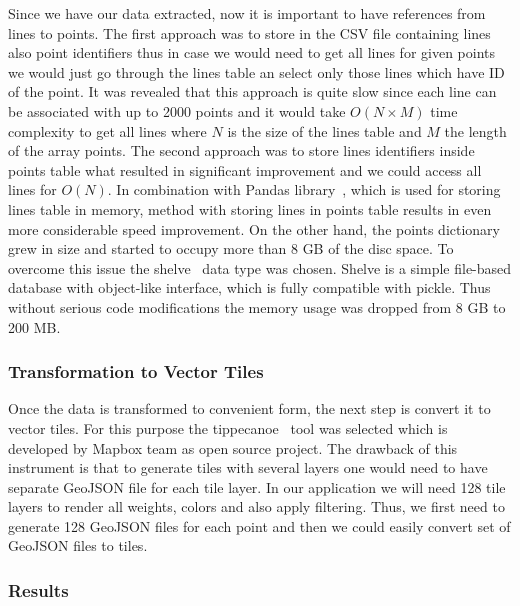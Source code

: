 Since we have our data extracted, now it is important to have references from lines to points. The
first approach was to store in the CSV file containing lines also point identifiers thus in case we
would need to get all lines for given points we would just go through the lines table an select only
those lines which have ID of the point. It was revealed that this approach is quite slow since each
line can be associated with up to 2000 points and it would take $O(N \times M)$ time complexity to
get all lines where $N$ is the size of the lines table and $M$ the length of the array points. The
second approach was to store lines identifiers inside points table what resulted in significant
improvement and we could access all lines for $O(N)$. In combination with Pandas
library~\cite{pandas}, which is used for storing lines table in memory, method with storing lines in
points table results in even more considerable speed improvement. On the other hand, the points
dictionary grew in size and started to occupy more than 8 GB of the disc space. To overcome this
issue the shelve~\cite{shelve} data type was chosen. Shelve is a simple file-based database with
object-like interface, which is fully compatible with pickle. Thus without serious code
modifications the memory usage was dropped from 8 GB to 200 MB.

\subsubsection{Transformation to Vector Tiles}

Once the data is transformed to convenient form, the next step is convert it to vector tiles.
For this purpose the tippecanoe~\cite{tippecanoe} tool was selected which is developed by Mapbox team
as open source project. The drawback of this instrument is that to generate tiles with several
layers one would need to have separate GeoJSON file for each tile layer. In our application we will
need 128 tile layers to render all weights, colors and also apply filtering. Thus, we first need to
generate 128 GeoJSON files for each point and then we could easily convert set of GeoJSON files to
tiles.

\subsubsection{Results}

